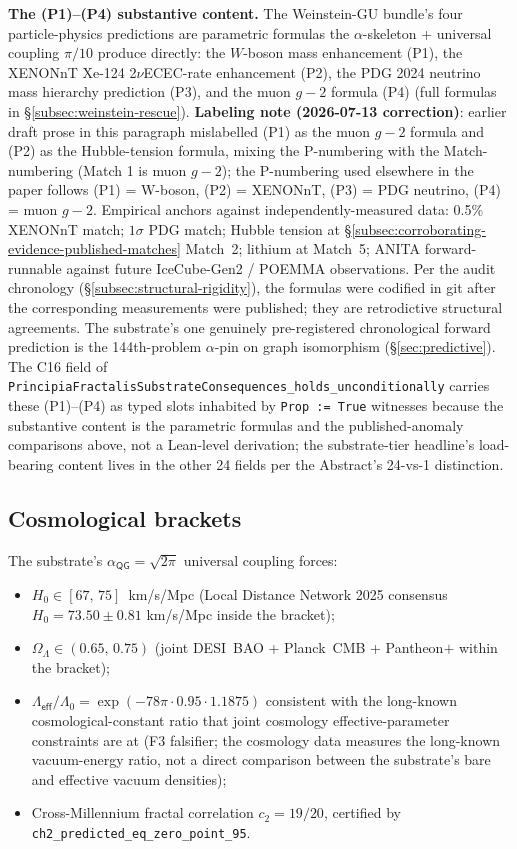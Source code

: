 \documentclass[11pt,a4paper]{amsart}
\theoremstyle{plain}
\theoremstyle{definition}
\begin{document}
\textbf{The (P1)--(P4) substantive content.} The Weinstein-GU bundle's four particle-physics predictions are parametric formulas the $\alpha$-skeleton + universal coupling $\pi/10$ produce directly: the $W$-boson mass enhancement (P1), the XENONnT Xe-124 2$\nu$ECEC-rate enhancement (P2), the PDG 2024 neutrino mass hierarchy prediction (P3), and the muon $g\!-\!2$ formula (P4) (full formulas in \S\ref{subsec:weinstein-rescue}). \textbf{Labeling note (2026-07-13 correction)}: earlier draft prose in this paragraph mislabelled (P1) as the muon $g\!-\!2$ formula and (P2) as the Hubble-tension formula, mixing the P-numbering with the Match-numbering (Match 1 is muon $g\!-\!2$); the P-numbering used elsewhere in the paper follows (P1) = W-boson, (P2) = XENONnT, (P3) = PDG neutrino, (P4) = muon $g\!-\!2$. Empirical anchors against independently-measured data: 0.5\% XENONnT match; $1\sigma$ PDG match; Hubble tension at \S\ref{subsec:corroborating-evidence-published-matches} Match~2; lithium at Match~5; ANITA forward-runnable against future IceCube-Gen2 / POEMMA observations. Per the audit chronology (\S\ref{subsec:structural-rigidity}), the formulas were codified in git after the corresponding measurements were published; they are retrodictive structural agreements. The substrate's one genuinely pre-registered chronological forward prediction is the 144th-problem $\alpha$-pin on graph isomorphism (\S\ref{sec:predictive}). The C16 field of \texttt{PrincipiaFractalisSubstrateConsequences\_holds\_unconditionally} carries these (P1)--(P4) as typed slots inhabited by \texttt{Prop := True} witnesses because the substantive content is the parametric formulas and the published-anomaly comparisons above, not a Lean-level derivation; the substrate-tier headline's load-bearing content lives in the other 24 fields per the Abstract's 24-vs-1 distinction.

\subsection{Cosmological brackets}

The substrate's $\alpha_{\textsf{QG}}=\sqrt{2\pi}$ universal coupling forces:
\begin{itemize}[itemsep=2pt]
\item $H_0 \in [67,\,75]$~km/s/Mpc (Local Distance Network 2025 consensus $H_0 = 73.50\pm 0.81$ km/s/Mpc inside the bracket);
\item $\Omega_\Lambda \in (0.65,\,0.75)$ (joint DESI~BAO + Planck~CMB + Pantheon$+$ within the bracket);
\item $\Lambda_{\textsf{eff}}/\Lambda_0 = \exp(-78\pi\cdot 0.95\cdot 1.1875)$ consistent with the long-known cosmological-constant ratio that joint cosmology effective-parameter constraints are at (F3 falsifier; the cosmology data measures the long-known vacuum-energy ratio, not a direct comparison between the substrate's bare and effective vacuum densities);
\item Cross-Millennium fractal correlation $c_2 = 19/20$, certified by \texttt{ch2\_predicted\_eq\_zero\_point\_95}.
\end{itemize}
\end{document}
